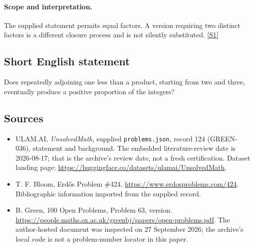 \documentclass[11pt,a4paper]{article}
\newcommand{\sref}[2]{\hyperlink{source:#1:#2}{[S#2]}}
\begin{document}
\paragraph{Scope and interpretation.}

The supplied statement permits equal factors. A version requiring two distinct factors is a different closure process and is not silently substituted. \sref{124}{1}

\subsection{Short English statement}

Does repeatedly adjoining one less than a product, starting from two and three, eventually produce a positive proportion of the integers?

\subsection{Sources}

{\small

\begin{itemize}

\item[\hypertarget{source:124:1}{S1}] ULAM.AI, \emph{UnsolvedMath}, supplied \texttt{problems.json}, record 124 (GREEN-036), statement and background. The embedded literature-review date is 2026-08-17; that is the archive’s review date, not a fresh certification. Dataset landing page: \url{https://huggingface.co/datasets/ulamai/UnsolvedMath}.

\item[\hypertarget{source:124:2}{S2}] T. F. Bloom, Erdős Problem \#424. \url{https://www.erdosproblems.com/424}. Bibliographic information imported from the supplied record.

\item[\hypertarget{source:124:3}{S3}] B. Green, 100 Open Problems, Problem 63, version. \url{https://people.maths.ox.ac.uk/greenbj/papers/open-problems.pdf}. The author-hosted document was inspected on 27 September 2026; the archive’s local code is not a problem-number locator in this paper.

\end{itemize}

}

\label{end:124}
\end{document}
